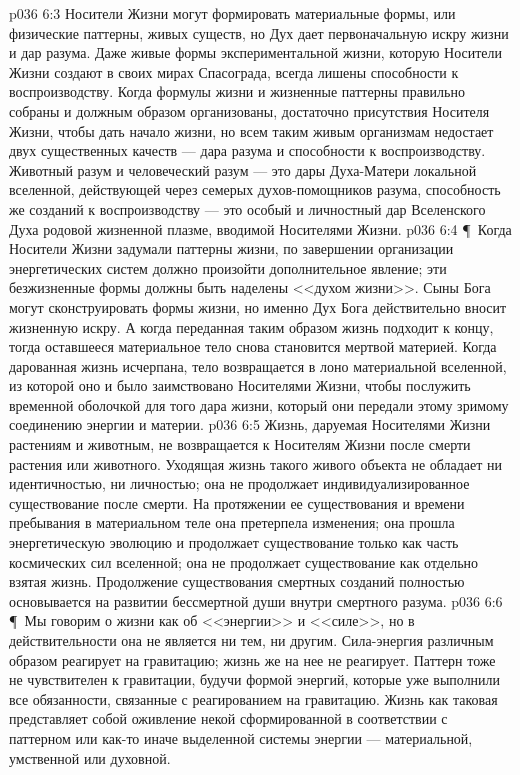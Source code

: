 \vs p036 6:3 Носители Жизни могут формировать материальные формы, или физические паттерны, живых существ, но Дух дает первоначальную искру жизни и дар разума. Даже живые формы экспериментальной жизни, которую Носители Жизни создают в своих мирах Спасограда, всегда лишены способности к воспроизводству. Когда формулы жизни и жизненные паттерны правильно собраны и должным образом организованы, достаточно присутствия Носителя Жизни, чтобы дать начало жизни, но всем таким живым организмам недостает двух существенных качеств --- дара разума и способности к воспроизводству. Животный разум и человеческий разум --- это дары Духа\hyp{}Матери локальной вселенной, действующей через семерых духов\hyp{}помощников разума, способность же созданий к воспроизводству --- это особый и личностный дар Вселенского Духа родовой жизненной плазме, вводимой Носителями Жизни.
\vs p036 6:4 \P\ Когда Носители Жизни задумали паттерны жизни, по завершении организации энергетических систем должно произойти дополнительное явление; эти безжизненные формы должны быть наделены <<духом жизни>>. Сыны Бога могут сконструировать формы жизни, но именно Дух Бога действительно вносит жизненную искру. А когда переданная таким образом жизнь подходит к концу, тогда оставшееся материальное тело снова становится мертвой материей. Когда дарованная жизнь исчерпана, тело возвращается в лоно материальной вселенной, из которой оно и было заимствовано Носителями Жизни, чтобы послужить временной оболочкой для того дара жизни, который они передали этому зримому соединению энергии и материи.
\vs p036 6:5 Жизнь, даруемая Носителями Жизни растениям и животным, не возвращается к Носителям Жизни после смерти растения или животного. Уходящая жизнь такого живого объекта не обладает ни идентичностью, ни личностью; она не продолжает индивидуализированное существование после смерти. На протяжении ее существования и времени пребывания в материальном теле она претерпела изменения; она прошла энергетическую эволюцию и продолжает существование только как часть космических сил вселенной; она не продолжает существование как отдельно взятая жизнь. Продолжение существования смертных созданий полностью основывается на развитии бессмертной души внутри смертного разума.
\vs p036 6:6 \P\ Мы говорим о жизни как об <<энергии>> и <<силе>>, но в действительности она не является ни тем, ни другим. Сила\hyp{}энергия различным образом реагирует на гравитацию; жизнь же на нее не реагирует. Паттерн тоже не чувствителен к гравитации, будучи формой энергий, которые уже выполнили все обязанности, связанные с реагированием на гравитацию. Жизнь как таковая представляет собой оживление некой сформированной в соответствии с паттерном или как\hyp{}то иначе выделенной системы энергии --- материальной, умственной или духовной.
